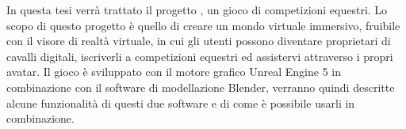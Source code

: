 
In questa tesi verrà trattato il progetto \nomeapp{}, un gioco di competizioni equestri.
%
Lo scopo di questo progetto è quello di creare un mondo virtuale immersivo, fruibile con il visore di realtà virtuale, in cui gli utenti possono diventare proprietari di cavalli digitali, iscriverli a competizioni equestri ed assistervi attraverso i propri avatar.
%
Il gioco è sviluppato con il motore grafico Unreal Engine 5 in combinazione con il software di modellazione Blender, verranno quindi descritte alcune funzionalità di questi due software e di come è possibile usarli in combinazione.






